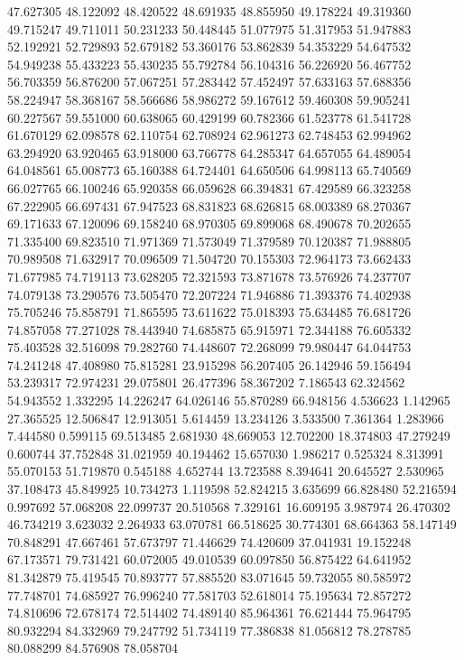 47.627305
48.122092
48.420522
48.691935
48.855950
49.178224
49.319360
49.715247
49.711011
50.231233
50.448445
51.077975
51.317953
51.947883
52.192921
52.729893
52.679182
53.360176
53.862839
54.353229
54.647532
54.949238
55.433223
55.430235
55.792784
56.104316
56.226920
56.467752
56.703359
56.876200
57.067251
57.283442
57.452497
57.633163
57.688356
58.224947
58.368167
58.566686
58.986272
59.167612
59.460308
59.905241
60.227567
59.551000
60.638065
60.429199
60.782366
61.523778
61.541728
61.670129
62.098578
62.110754
62.708924
62.961273
62.748453
62.994962
63.294920
63.920465
63.918000
63.766778
64.285347
64.657055
64.489054
64.048561
65.008773
65.160388
64.724401
64.650506
64.998113
65.740569
66.027765
66.100246
65.920358
66.059628
66.394831
67.429589
66.323258
67.222905
66.697431
67.947523
68.831823
68.626815
68.003389
68.270367
69.171633
67.120096
69.158240
68.970305
69.899068
68.490678
70.202655
71.335400
69.823510
71.971369
71.573049
71.379589
70.120387
71.988805
70.989508
71.632917
70.096509
71.504720
70.155303
72.964173
73.662433
71.677985
74.719113
73.628205
72.321593
73.871678
73.576926
74.237707
74.079138
73.290576
73.505470
72.207224
71.946886
71.393376
74.402938
75.705246
75.858791
71.865595
73.611622
75.018393
75.634485
76.681726
74.857058
77.271028
78.443940
74.685875
65.915971
72.344188
76.605332
75.403528
32.516098
79.282760
74.448607
72.268099
79.980447
64.044753
74.241248
47.408980
75.815281
23.915298
56.207405
26.142946
59.156494
53.239317
72.974231
29.075801
26.477396
58.367202
7.186543
62.324562
54.943552
1.332295
14.226247
64.026146
55.870289
66.948156
4.536623
1.142965
27.365525
12.506847
12.913051
5.614459
13.234126
3.533500
7.361364
1.283966
7.444580
0.599115
69.513485
2.681930
48.669053
12.702200
18.374803
47.279249
0.600744
37.752848
31.021959
40.194462
15.657030
1.986217
0.525324
8.313991
55.070153
51.719870
0.545188
4.652744
13.723588
8.394641
20.645527
2.530965
37.108473
45.849925
10.734273
1.119598
52.824215
3.635699
66.828480
52.216594
0.997692
57.068208
22.099737
20.510568
7.329161
16.609195
3.987974
26.470302
46.734219
3.623032
2.264933
63.070781
66.518625
30.774301
68.664363
58.147149
70.848291
47.667461
57.673797
71.446629
74.420609
37.041931
19.152248
67.173571
79.731421
60.072005
49.010539
60.097850
56.875422
64.641952
81.342879
75.419545
70.893777
57.885520
83.071645
59.732055
80.585972
77.748701
74.685927
76.996240
77.581703
52.618014
75.195634
72.857272
74.810696
72.678174
72.514402
74.489140
85.964361
76.621444
75.964795
80.932294
84.332969
79.247792
51.734119
77.386838
81.056812
78.278785
80.088299
84.576908
78.058704
